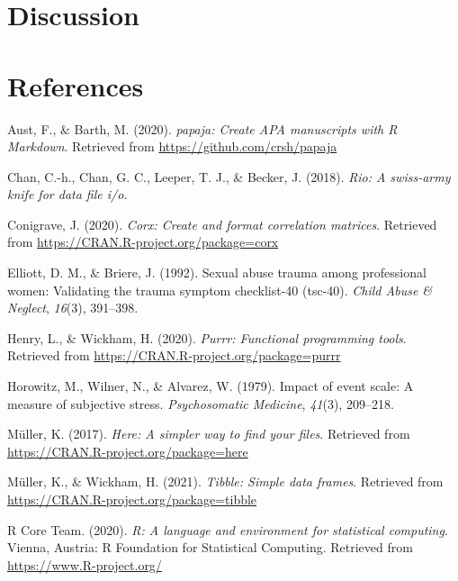 \documentclass[
  english,
  man,draftall]{apa6}
\begin{document}
\hypertarget{discussion}{%
\section{Discussion}\label{discussion}}

\newpage

\hypertarget{references}{%
\section{References}\label{references}}

\begingroup
\setlength{\parindent}{-0.5in}
\setlength{\leftskip}{0.5in}

\hypertarget{refs}{}
\leavevmode\hypertarget{ref-R-papaja}{}%
Aust, F., \& Barth, M. (2020). \emph{papaja: Create APA manuscripts with R Markdown}. Retrieved from \url{https://github.com/crsh/papaja}

\leavevmode\hypertarget{ref-R-rio}{}%
Chan, C.-h., Chan, G. C., Leeper, T. J., \& Becker, J. (2018). \emph{Rio: A swiss-army knife for data file i/o}.

\leavevmode\hypertarget{ref-R-corx}{}%
Conigrave, J. (2020). \emph{Corx: Create and format correlation matrices}. Retrieved from \url{https://CRAN.R-project.org/package=corx}

\leavevmode\hypertarget{ref-elliott1992}{}%
Elliott, D. M., \& Briere, J. (1992). Sexual abuse trauma among professional women: Validating the trauma symptom checklist-40 (tsc-40). \emph{Child Abuse \& Neglect}, \emph{16}(3), 391--398.

\leavevmode\hypertarget{ref-R-purrr}{}%
Henry, L., \& Wickham, H. (2020). \emph{Purrr: Functional programming tools}. Retrieved from \url{https://CRAN.R-project.org/package=purrr}

\leavevmode\hypertarget{ref-horowitz1979}{}%
Horowitz, M., Wilner, N., \& Alvarez, W. (1979). Impact of event scale: A measure of subjective stress. \emph{Psychosomatic Medicine}, \emph{41}(3), 209--218.

\leavevmode\hypertarget{ref-R-here}{}%
Müller, K. (2017). \emph{Here: A simpler way to find your files}. Retrieved from \url{https://CRAN.R-project.org/package=here}

\leavevmode\hypertarget{ref-R-tibble}{}%
Müller, K., \& Wickham, H. (2021). \emph{Tibble: Simple data frames}. Retrieved from \url{https://CRAN.R-project.org/package=tibble}

\leavevmode\hypertarget{ref-R-base}{}%
R Core Team. (2020). \emph{R: A language and environment for statistical computing}. Vienna, Austria: R Foundation for Statistical Computing. Retrieved from \url{https://www.R-project.org/}
\end{document}
